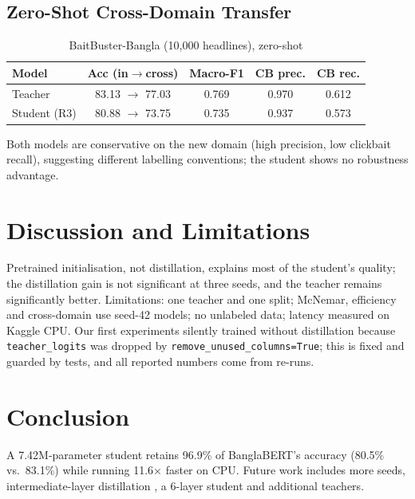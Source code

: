\documentclass[conference]{IEEEtran}
\begin{document}
\subsection{Zero-Shot Cross-Domain Transfer}
\begin{table}[htbp]
\caption{BaitBuster-Bangla (10,000 headlines), zero-shot}
\begin{center}
\begin{tabular}{lcccc}
\toprule
\textbf{Model} & \textbf{Acc (in$\to$cross)} & \textbf{Macro-F1} & \textbf{CB prec.} & \textbf{CB rec.} \\
\midrule
Teacher & 83.13 $\to$ 77.03 & 0.769 & 0.970 & 0.612 \\
Student (R3) & 80.88 $\to$ 73.75 & 0.735 & 0.937 & 0.573 \\
\bottomrule
\end{tabular}
\label{tab:cross}
\end{center}
\end{table}
Both models are conservative on the new domain (high precision, low clickbait recall), suggesting different labelling conventions; the student shows no robustness advantage.

\section{Discussion and Limitations}
Pretrained initialisation, not distillation, explains most of the student's quality; the distillation gain is not significant at three seeds, and the teacher remains significantly better. Limitations: one teacher and one split; McNemar, efficiency and cross-domain use seed-42 models; no unlabeled data; latency measured on Kaggle CPU. Our first experiments silently trained without distillation because \texttt{teacher\_logits} was dropped by \texttt{remove\_unused\_columns=True}; this is fixed and guarded by tests, and all reported numbers come from re-runs.

\section{Conclusion}
A 7.42M-parameter student retains 96.9\% of BanglaBERT's accuracy (80.5\% vs.\ 83.1\%) while running 11.6$\times$ faster on CPU. Future work includes more seeds, intermediate-layer distillation \cite{jiao2020}, a 6-layer student and additional teachers.
\end{document}

